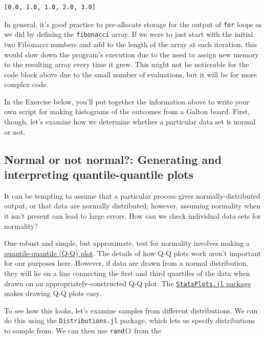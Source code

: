 \documentclass[
  11pt,
]{book}
\begin{document}
\begin{verbatim}
[0.0, 1.0, 1.0, 2.0, 3.0]
\end{verbatim}

In general, it's good practice to pre-allocate storage for the output of \texttt{for} loops as we did by defining the \texttt{fibonacci} array. If we were to just start with the initial two Fibonacci numbers and add to the length of the array at each iteration, this would slow down the program's execution due to the need to assign new memory to the resulting array every time it grew. This might not be noticeable for the code block above due to the small number of evaluations, but it will be for more complex code.

In the Exercise below, you'll put together the information above to write your own script for making histograms of the outcomes from a Galton board. First, though, let's examine how we determine whether a particular data set is normal or not.

\hypertarget{normal-or-not-normal-generating-and-interpreting-quantile-quantile-plots}{%
\subsection{Normal or not normal?: Generating and interpreting quantile-quantile plots}\label{normal-or-not-normal-generating-and-interpreting-quantile-quantile-plots}}

It can be tempting to assume that a particular process gives normally-distributed output, or that data are normally distributed; however, assuming normality when it isn't present can lead to large errors. How can we check individual data sets for normality?

One robust and simple, but approximate, test for normality involves making a \href{https://en.wikipedia.org/wiki/Q-Q_plot}{quantile-quantile (Q-Q) plot}. The details of how Q-Q plots work aren't important for our purposes here. However, if data are drawn from a normal distribution, they will lie on a line connecting the first and third quartiles of the data when drawn on an appropriately-constructed Q-Q plot. The \href{https://github.com/JuliaPlots/StatsPlots.jl}{\texttt{StatsPlots.jl} package} makes drawing Q-Q plots easy.

To see how this looks, let's examine samples from different distributions. We can do this using the \texttt{Distributions.jl} package, which lets us specify distributions to sample from. We can then use \texttt{rand()} from the
\end{document}
